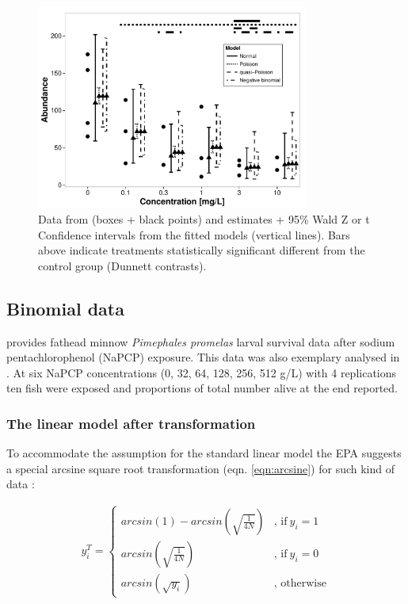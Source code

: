 \documentclass{scrartcl}
\begin{document}
\begin{figure}[h]
  \centering
  \includegraphics[width = 0.8\textwidth]{example.pdf}
  \caption{Data from \citet{brock_minimum_2014} (boxes + black points) and estimates + 95\% Wald Z or t Confidence intervals from the fitted models (vertical lines). 
  Bars above indicate treatments statistically significant different from the control group (Dunnett contrasts).}
  \label{fig:example}
\end{figure}


\subsection{Binomial data}
\citet{weber_short-term_1989} provides fathead minnow \textit{Pimephales promelas} larval survival data after sodium pentachlorophenol (NaPCP) exposure.
This data was also exemplary analysed in \citet{newman_quantitative_2012}.
At six NaPCP concentrations (0, 32, 64, 128, 256, 512 \textmu g/L) with 4 replications ten fish were exposed and proportions of total number alive at the end reported.

\subsubsection{The linear model after transformation}
To accommodate the assumption for the standard linear model the EPA suggests a special arcsine square root transformation (eqn. \ref{eqn:arcsine}) for such kind of data \citep{epa_methods_2002}:

\begin{align}
  y_i^T = 
  \begin{cases}  
    arcsin(1) - arcsin(\sqrt{\frac{1}{4N}}) & \text{, if}\ y_i = 1 \\
    arcsin(\sqrt{\frac{1}{4N}}) & \text{, if}\ y_i = 0  \\
    arcsin(\sqrt{y_i}) & \text{, otherwise}
  \end{cases} \label{eqn:arcsine}
\end{align}
\end{document}

